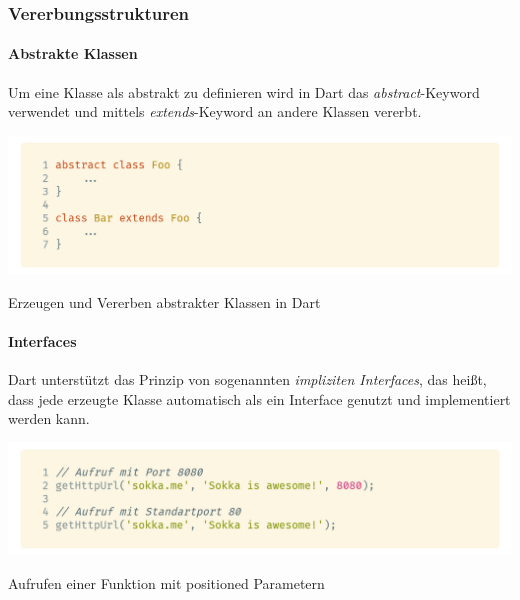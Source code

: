 \subsubsection{Vererbungsstrukturen}

\paragraph{Abstrakte Klassen}


Um eine Klasse als abstrakt zu definieren wird in Dart das \textit{abstract}-Keyword verwendet und mittels
\textit{extends}-Keyword an andere Klassen vererbt.

\begin{code}
    \centering
    \includegraphics[width=1\textwidth]{images/Dart/theory/dartAbstractClass.png}
    \caption{Erzeugen und Vererben abstrakter Klassen in Dart}
\end{code}

\paragraph{Interfaces}
 

Dart unterstützt das Prinzip von sogenannten \textit{impliziten Interfaces}, das heißt, dass jede
erzeugte Klasse automatisch als ein Interface genutzt und implementiert werden kann.

\begin{code}
    \centering
    \includegraphics[width=1\textwidth]{images/Dart/theory/dartCallPositionedFunction.png}
    \caption{Aufrufen einer Funktion mit positioned Parametern}
\end{code}